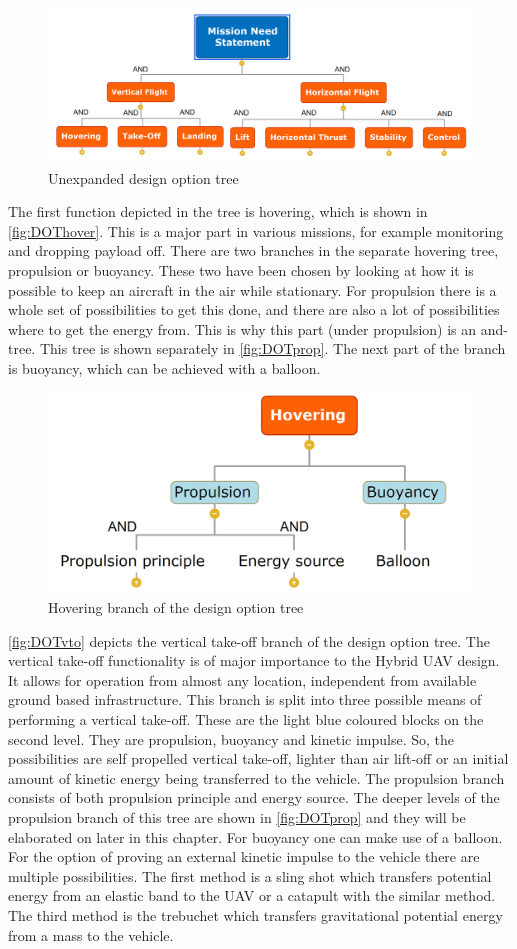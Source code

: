 \begin{figure}[H]
\centering
\includegraphics[width=.55\textwidth]{Concepts/Figures/Toplevel}
\caption{Unexpanded design option tree}
\label{fig:DOTmain}
\end{figure}

The first function depicted in the tree is hovering, which is shown in \autoref{fig:DOThover}. This is a major part in various missions, for example monitoring and dropping payload off. There are two branches in the separate hovering tree, propulsion or buoyancy. These two have been chosen by looking at how it is possible to keep an aircraft in the air while stationary. For propulsion there is a whole set of possibilities to get this done, and there are also a lot of possibilities where to get the energy from. This is why this part (under propulsion) is an and-tree. This tree is shown separately in \autoref{fig:DOTprop}. The next part of the branch is buoyancy, which can be achieved with a balloon.

\begin{figure}[H]
\centering
\includegraphics[width=.5\textwidth]{Concepts/Figures/Hovering}
\caption{Hovering branch of the design option tree}
\label{fig:DOThover}
\end{figure}

\autoref{fig:DOTvto} depicts the vertical take-off branch of the design option tree. The vertical take-off functionality is of major importance to the Hybrid UAV design. It allows for operation from almost any location, independent from available ground based infrastructure. This branch is split into three possible means of performing a vertical take-off. These are the light blue coloured blocks on the second level. They are propulsion, buoyancy and kinetic impulse. So, the possibilities are self propelled vertical take-off, lighter than air lift-off or an initial amount of kinetic energy being transferred to the vehicle. The propulsion branch consists of both propulsion principle and energy source. The deeper levels of the propulsion branch of this tree are shown in \autoref{fig:DOTprop} and they will be elaborated on later in this chapter. For buoyancy one can make use of a balloon. For the option of proving an external kinetic impulse to the vehicle there are multiple possibilities. The first method is a sling shot which transfers potential energy from an elastic band to the UAV or a catapult with the similar method. The third method is the trebuchet which transfers gravitational potential energy from a mass to the vehicle.

